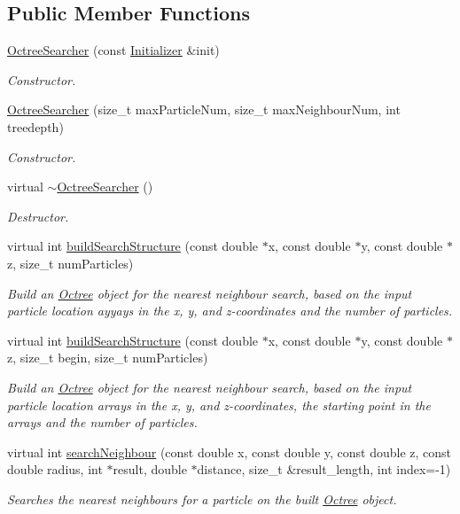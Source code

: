 \subsection*{Public Member Functions}
\begin{DoxyCompactItemize}
\item 
\hyperlink{classOctreeSearcher_ac2c8c97728fffdf4149c97ee336e7a9f}{Octree\-Searcher} (const \hyperlink{classInitializer}{Initializer} \&init)
\begin{DoxyCompactList}\small\item\em Constructor. \end{DoxyCompactList}\item 
\hyperlink{classOctreeSearcher_ac47c6353d956585475cc1ce62b69afe0}{Octree\-Searcher} (size\-\_\-t max\-Particle\-Num, size\-\_\-t max\-Neighbour\-Num, int treedepth)
\begin{DoxyCompactList}\small\item\em Constructor. \end{DoxyCompactList}\item 
virtual \hyperlink{classOctreeSearcher_a2bdc0bfe3a735b21055f310ddd41031d}{$\sim$\-Octree\-Searcher} ()
\begin{DoxyCompactList}\small\item\em Destructor. \end{DoxyCompactList}\item 
virtual int \hyperlink{classOctreeSearcher_acc585c4f280f453930f0d1e33f8ed040}{build\-Search\-Structure} (const double $\ast$x, const double $\ast$y, const double $\ast$z, size\-\_\-t num\-Particles)
\begin{DoxyCompactList}\small\item\em Build an \hyperlink{classOctree}{Octree} object for the nearest neighbour search, based on the input particle location ayyays in the x, y, and z-\/coordinates and the number of particles. \end{DoxyCompactList}\item 
virtual int \hyperlink{classOctreeSearcher_a3fd644ff4fe22f3fc5d2ab154449d839}{build\-Search\-Structure} (const double $\ast$x, const double $\ast$y, const double $\ast$z, size\-\_\-t begin, size\-\_\-t num\-Particles)
\begin{DoxyCompactList}\small\item\em Build an \hyperlink{classOctree}{Octree} object for the nearest neighbour search, based on the input particle location arrays in the x, y, and z-\/coordinates, the starting point in the arrays and the number of particles. \end{DoxyCompactList}\item 
virtual int \hyperlink{classOctreeSearcher_a30a8a3fc13649be5640f599721f2526a}{search\-Neighbour} (const double x, const double y, const double z, const double radius, int $\ast$result, double $\ast$distance, size\-\_\-t \&result\-\_\-length, int index=-\/1)
\begin{DoxyCompactList}\small\item\em Searches the nearest neighbours for a particle on the built \hyperlink{classOctree}{Octree} object. \end{DoxyCompactList}\end{DoxyCompactItemize}


